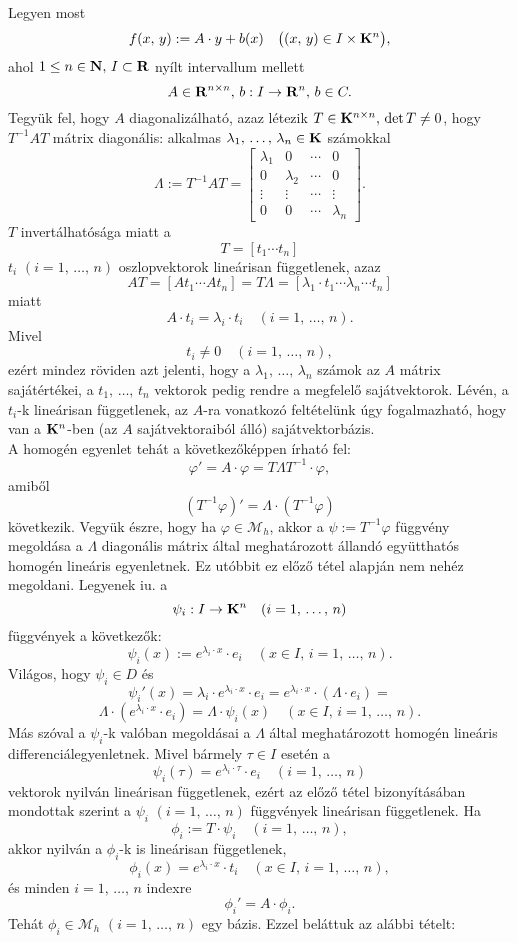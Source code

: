 Legyen most
\[
f(x, \, y) := A \cdot y + b(x) \quad \big( (x, \, y) \in I \times \mathbf{K}^n \big),
\]
ahol $1 \leq n \in \mathbf{N}, \, I \subset \mathbf{R}$ nyílt intervallum mellett
\[
A \in \mathbf{R}^{n \times n}, \, b : I \to \mathbf{R}^n, \, b \in C.
\]
Tegyük fel, hogy $A$ diagonalizálható, azaz létezik $T \in \mathbf{K}^{n \times n}, \, \det T \neq 0$, hogy $T^{-1}AT$ mátrix diagonális: alkalmas $\lambda_1, \, \dots, \, \lambda_n \in \mathbf{K}$ számokkal
\[
\Lambda := T^{-1}AT = \begin{bmatrix}
	\lambda_1 & 0 & \cdots & 0 \\
	0 & \lambda_2 & \cdots & 0 \\
	\vdots & \vdots & \cdots & \vdots \\
	0 & 0 & \cdots & \lambda_n
\end{bmatrix}.
\]
$T$ invertálhatósága miatt a
\[
T = [t_1 \cdots t_n]
\]
$t_i$ $(i=1, \, \dots, \, n)$ oszlopvektorok lineárisan függetlenek, azaz
\[
AT = [At_1 \cdots At_n] = T\Lambda = [\lambda_1 \cdot t_1 \cdots \lambda_n \cdots t_n]
\]
miatt
\[
A \cdot t_i = \lambda_i \cdot t_i \quad (i = 1, \, \dots, \, n).
\]
Mivel
\[
t_i \neq 0 \quad (i = 1, \, \dots, \, n),
\]
ezért mindez röviden azt jelenti, hogy a $\lambda_1, \, \dots, \, \lambda_n$ számok az $A$ mátrix sajátértékei, a $t_1, \, \dots, \, t_n$ vektorok pedig rendre a megfelelő sajátvektorok. Lévén, a $t_i$-k lineárisan függetlenek, az $A$-ra vonatkozó feltételünk úgy fogalmazható, hogy van a $\mathbf{K}^n$-ben (az $A$ sajátvektoraiból álló) sajátvektorbázis.\\

A homogén egyenlet tehát a következőképpen írható fel:
\[
\varphi' = A \cdot \varphi = T \Lambda T^{-1} \cdot \varphi,
\]
amiből
\[
(T^{-1}\varphi)' = \Lambda \cdot (T^{-1} \varphi)
\]
következik. Vegyük észre, hogy ha $\varphi \in \mathcal{M}_h$, akkor a $\psi := T^{-1}\varphi$ függvény megoldása a $\Lambda$ diagonális mátrix által meghatározott állandó együtthatós homogén lineáris egyenletnek. Ez utóbbit ez előző tétel alapján nem nehéz megoldani. Legyenek iu. a
\[
\psi_i : I \to \mathbf{K}^n \quad (i = 1, \, \dots, \, n)
\]
függvények a következők:
\[
\psi_i(x) := e^{\lambda_i \cdot x} \cdot e_i \quad (x \in I, \, i = 1, \, \dots, \, n).
\]
Világos, hogy $\psi_i \in D$ és
\[
\psi_i'(x) = \lambda_i \cdot e^{\lambda_i \cdot x} \cdot e_i = e^{\lambda_i \cdot x} \cdot (\Lambda \cdot e_i) =
\]
\[
\Lambda \cdot (e^{\lambda_i \cdot x} \cdot e_i) = \Lambda \cdot \psi_i(x) \quad (x \in I, \, i = 1, \, \dots, \, n).
\]
Más szóval a $\psi_i$-k valóban megoldásai a $\Lambda$ által meghatározott homogén lineáris differenciálegyenletnek. Mivel bármely $\tau \in I$ esetén a
\[
\psi_i(\tau) = e^{\lambda_i \cdot \tau} \cdot e_i \quad (i = 1, \, \dots, \, n)
\]
vektorok nyilván lineárisan függetlenek, ezért az előző tétel bizonyításában mondottak szerint a $\psi_i$ $(i = 1, \, \dots, \, n)$ függvények lineárisan függetlenek. Ha
\[
\phi_i := T \cdot \psi_i \quad (i = 1, \, \dots, \, n),
\]
akkor nyilván a $\phi_i$-k is lineárisan függetlenek,
\[
\phi_i(x) = e^{\lambda_i \cdot x} \cdot t_i \quad (x \in I, \, i = 1, \, \dots, \, n),
\]
és minden $i = 1, \, \dots, \, n$ indexre
\[
\phi_i' = A \cdot \phi_i.
\]
Tehát $\phi_i \in \mathcal{M}_h$ $(i = 1, \, \dots, \, n)$ egy bázis. Ezzel beláttuk az alábbi tételt:\\

